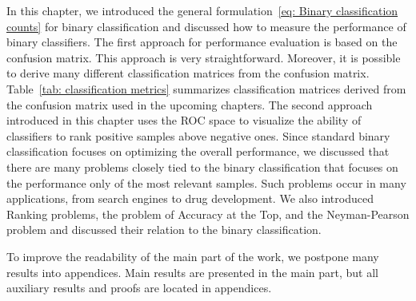 In this chapter, we introduced the general formulation~\eqref{eq: Binary classification counts} for binary classification and discussed how to measure the performance of binary classifiers. The first approach for performance evaluation is based on the confusion matrix. This approach is very straightforward. Moreover, it is possible to derive many different classification matrices from the confusion matrix. Table~\ref{tab: classification metrics} summarizes classification matrices derived from the confusion matrix used in the upcoming chapters. The second approach introduced in this chapter uses the ROC space to visualize the ability of classifiers to rank positive samples above negative ones. Since standard binary classification focuses on optimizing the overall performance, we discussed that there are many problems closely tied to the binary classification that focuses on the performance only of the most relevant samples. Such problems occur in many applications, from search engines to drug development. We also introduced Ranking problems, the problem of Accuracy at the Top, and the Neyman-Pearson problem and discussed their relation to the binary classification.

\begin{note}
  To improve the readability of the main part of the work, we postpone many results into appendices. Main results are presented in the main part, but all auxiliary results and proofs are located in appendices.
\end{note}
